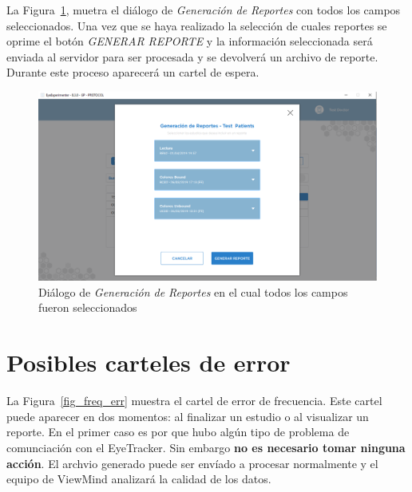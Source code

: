 \documentclass[a4paper,10pt]{article}
\begin{document}
La Figura~\ref{fig_all_sel}, muetra el diálogo de \textit{Generación de Reportes} con todos los campos seleccionados. Una vez que se haya realizado la selección de cuales reportes se oprime el botón \textit{GENERAR REPORTE} y la información seleccionada será enviada al servidor para ser procesada y se devolverá un archivo de reporte. Durante este proceso aparecerá un cartel de espera.

\begin{figure}[!h]
\centering
\includegraphics[scale = 0.4]{allselected.png}
\caption{Diálogo de \textit{Generación de Reportes} en el cual todos los campos fueron seleccionados}
\label{fig_all_sel}
\end{figure}

\section{Posibles carteles de error}

La Figura~\ref{fig_freq_err} muestra el cartel de error de frecuencia. Este cartel puede aparecer en dos momentos: al finalizar un estudio o al visualizar un reporte. En el primer caso es por que hubo algún tipo de problema de comunciación con el EyeTracker. Sin embargo \textbf{no es necesario tomar ninguna acción}. El archvio generado puede ser envíado a procesar normalmente y el equipo de ViewMind analizará la calidad de los datos. 
\end{document}
